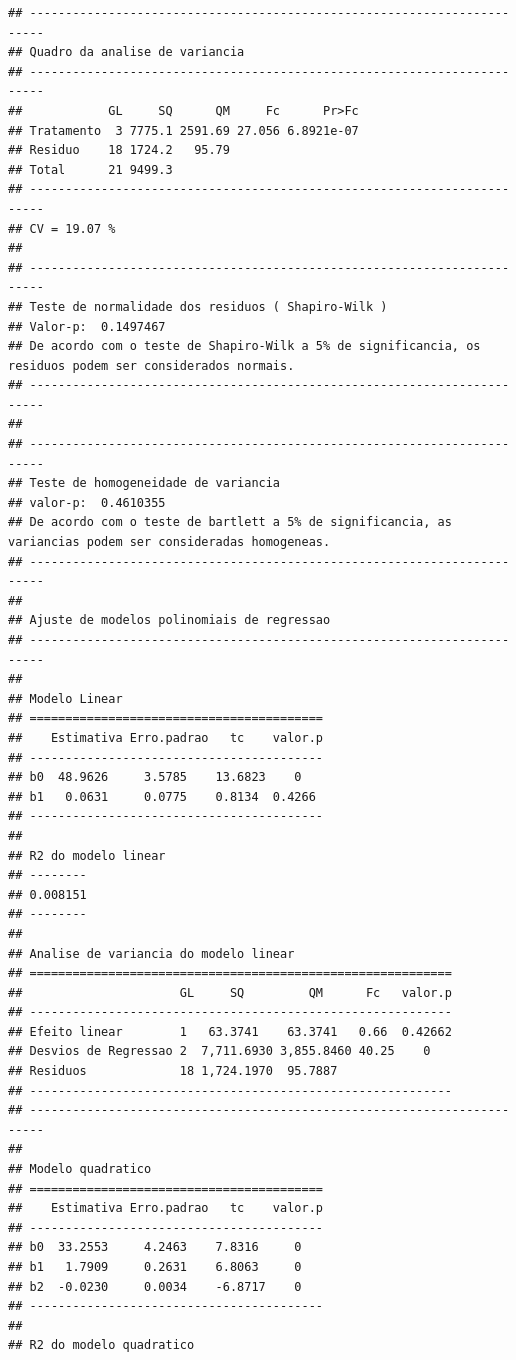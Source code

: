 \documentclass[
]{article}
\begin{document}
\begin{verbatim}
## ------------------------------------------------------------------------
## Quadro da analise de variancia
## ------------------------------------------------------------------------
##            GL     SQ      QM     Fc      Pr>Fc
## Tratamento  3 7775.1 2591.69 27.056 6.8921e-07
## Residuo    18 1724.2   95.79                  
## Total      21 9499.3                          
## ------------------------------------------------------------------------
## CV = 19.07 %
## 
## ------------------------------------------------------------------------
## Teste de normalidade dos residuos ( Shapiro-Wilk ) 
## Valor-p:  0.1497467 
## De acordo com o teste de Shapiro-Wilk a 5% de significancia, os residuos podem ser considerados normais.
## ------------------------------------------------------------------------
## 
## ------------------------------------------------------------------------
## Teste de homogeneidade de variancia 
## valor-p:  0.4610355 
## De acordo com o teste de bartlett a 5% de significancia, as variancias podem ser consideradas homogeneas.
## ------------------------------------------------------------------------
## 
## Ajuste de modelos polinomiais de regressao
## ------------------------------------------------------------------------
## 
## Modelo Linear
## =========================================
##    Estimativa Erro.padrao   tc    valor.p
## -----------------------------------------
## b0  48.9626     3.5785    13.6823    0   
## b1   0.0631     0.0775    0.8134  0.4266 
## -----------------------------------------
## 
## R2 do modelo linear
## --------
## 0.008151
## --------
## 
## Analise de variancia do modelo linear
## ===========================================================
##                      GL     SQ         QM      Fc   valor.p
## -----------------------------------------------------------
## Efeito linear        1   63.3741    63.3741   0.66  0.42662
## Desvios de Regressao 2  7,711.6930 3,855.8460 40.25    0   
## Residuos             18 1,724.1970  95.7887                
## -----------------------------------------------------------
## ------------------------------------------------------------------------
## 
## Modelo quadratico
## =========================================
##    Estimativa Erro.padrao   tc    valor.p
## -----------------------------------------
## b0  33.2553     4.2463    7.8316     0   
## b1   1.7909     0.2631    6.8063     0   
## b2  -0.0230     0.0034    -6.8717    0   
## -----------------------------------------
## 
## R2 do modelo quadratico

\end{verbatim}
\end{document}
